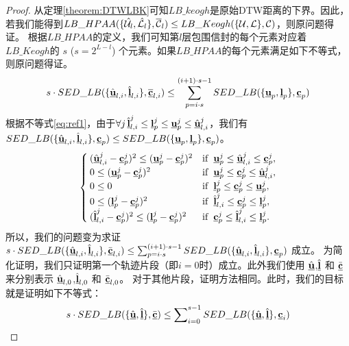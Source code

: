 \begin{proof}
	从定理\ref{theorem:DTWLBK}可知$LB\_keogh$是原始DTW距离的下界。因此，若我们能得到$LB\_HPAA({  \{\hat{{\cal U}_{l}}, \hat{{\cal L}_{l}}\},\overline{{\cal C}}_{l}}) \le LB\_Keogh({\{\cal U,\cal L\},{\cal C}}) $，则原问题得证。
	根据$LB\_HPAA$的定义，我们可知第$l$层包围信封的每个元素对应着$LB\_Keogh$的 $s$ ($s=2^{L-l}$) 个元素。如果$LB\_HPAA$的每个元素满足如下不等式，则原问题得证。
	\begin{eqnarray}\label{eq:tmp1}
	s \cdot	SED\_LB(\{ \hat{\emph{{\textbf{u}}}}_{l,i}, \hat{\emph{{\textbf{l}}}}_{l,i} \}, \overline{\emph{{\textbf{c}}}}_{l,i}) \le
	\sum_{p=i \cdot s}^{(i+1)\cdot s-1} SED\_LB(\{{\emph{{\textbf{u}}}_{p}},\emph{{\textbf{l}}}_{p} \},\emph{{\textbf{c}}}_{p})
	\end{eqnarray}
	根据不等式\ref{eq:ref1}，由于$\forall j \,  \hat{\emph{{\textbf{l}}}}_{l,i}^{j}\le \emph{{\textbf{l}}}_{p}^{j}\le \emph{{\textbf{u}}}_{p}^{j}\le \hat{\emph{{\textbf{u}}}}_{l,i}^{j}$，我们有$SED\_LB ( \{ \hat{\emph{{\textbf{u}}}}_{l,i}, \hat{\emph{{\textbf{l}}}}_{l,i} \}, \emph{{\textbf{c}}}_{p}) \le
	SED\_LB ( \{ {\emph{{\textbf{u}}}_{p}}, \emph{{\textbf{l}}}_{p} \}, \emph{{\textbf{c}}}_{p})$。
	\begin{equation}\label{eq:ref1}
	\begin{cases}
	(\hat{\emph{{\textbf{u}}}}_{l,i}^{j}- {\emph{{\textbf{c}}}}_{p}^{j})^2 \le ({\emph{{\textbf{u}}}}_{p}^{j} - {\emph{{\textbf{c}}}}_{p}^{j})^2 & {\rm if}  \,\,\,   \emph{{\textbf{u}}}_{p}^{j} \le  \hat{\emph{{\textbf{u}}}}_{l,i}^{j} \le {\emph{{\textbf{c}}}}_{p}^{j},  \\
	0	\le ({\emph{{\textbf{u}}}}_{p}^{j} - {\emph{{\textbf{c}}}}_{p}^{j})^2 &	{\rm if} \,\,\,   \emph{{\textbf{u}}}_{p}^{j} \le {\emph{{\textbf{c}}}}_{p}^{j} \le  \hat{\emph{{\textbf{u}}}}_{l,i}^{j},  \\
	0 \le 0 &	{\rm if}  \,\,\,     \emph{{\textbf{l}}}_{p}^{j} \le   {\emph{{\textbf{c}}}}_{p}^{j} \le    \emph{{\textbf{u}}}_{p}^{j},  \\
	0 \le ({\emph{{\textbf{l}}}}_{p}^{j} - {\emph{{\textbf{c}}}}_{p}^{j})^2 &	{\rm if} \,\,\,   \hat{\emph{{\textbf{l}}}}_{l,i}^{j} \le   {\emph{{\textbf{c}}}}_{p}^{j} \le  \emph{{\textbf{l}}}_{p}^{j},  \\
	(\hat{\emph{{\textbf{l}}}}_{l,i}^{j}- {\emph{{\textbf{c}}}}_{p}^{j})^2 \le ({\emph{{\textbf{l}}}}_{p}^{j} - {\emph{{\textbf{c}}}}_{p}^{j})^2 & {\rm if}  \,\,\,  {\emph{{\textbf{c}}}}_{p}^{j} \le \hat{\emph{{\textbf{l}}}}_{l,i}^{j} \le  \emph{{\textbf{l}}}_{p}^{j}.
	\end{cases}
	\end{equation}
	所以，我们的问题变为求证$s \cdot	SED\_LB(\{ \hat{\emph{{\textbf{u}}}}_{l,i}, \hat{\emph{{\textbf{l}}}}_{l,i} \}, \bar{\emph{{\textbf{c}}}}_{l,i})  \le	\sum_{p=i \cdot s}^{(i+1)\cdot s-1} SED\_LB(\{ \hat{\emph{{\textbf{u}}}}_{l,i}, \hat{\emph{{\textbf{l}}}}_{l,i} \}, \emph{{\textbf{c}}}_{p})$ 成立。
	为简化证明，我们只证明第一个轨迹片段（即$i=0$时）成立。此外我们使用  $\hat{\emph{{\textbf{u}}}}$,$\hat{\emph{{\textbf{l}}}}$ 和 $\bar{\emph{{\textbf{c}}}}$ 来分别表示  $\hat{\emph{{\textbf{u}}}}_{l,0}$,$\hat{\emph{{\textbf{l}}}}_{l,0}$ 和 $\bar{\emph{{\textbf{c}}}}_{l,0}$。 对于其他片段，证明方法相同。此时，我们的目标就是证明如下不等式：
	\begin{eqnarray}\label{eq:transZero}
	s	\cdot	SED\_LB(\{ \hat{\emph{{\textbf{u}}}}, \hat{\emph{{\textbf{l}}}} \}, \bar{\emph{{\textbf{c}}}}) \le \sum\nolimits_{i=0}^{s-1}SED\_LB(\{ \hat{\emph{{\textbf{u}}}}, \hat{\emph{{\textbf{l}}}} \}, \emph{{\textbf{c}}}_{i})
	\end{eqnarray}
	

\end{proof}
